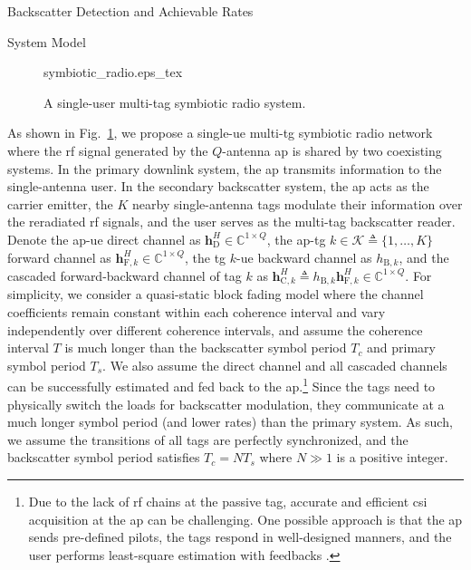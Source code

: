\documentclass[journal]{IEEEtran}
\begin{document}
	\begin{section}{Backscatter Detection and Achievable Rates}
		\begin{subsection}{System Model}
			\begin{figure}[!t]
				\centering
				\def\svgwidth{0.9\columnwidth}
				{symbiotic_radio.eps_tex}
				\caption{A single-user multi-tag symbiotic radio system.}
				\label{fi:symbiotic_radio}
			\end{figure}
			As shown in Fig.~\ref{fi:symbiotic_radio}, we propose a single-\gls{ue} multi-\gls{tg} symbiotic radio network where the \gls{rf} signal generated by the $Q$-antenna \gls{ap} is shared by two coexisting systems. In the primary downlink system, the \gls{ap} transmits information to the single-antenna user. In the secondary backscatter system, the \gls{ap} acts as the carrier emitter, the $K$ nearby single-antenna tags modulate their information over the reradiated \gls{rf} signals, and the user serves as the multi-tag backscatter reader. Denote the \gls{ap}-\gls{ue} direct channel as $\boldsymbol{h}_{\mathrm{D}}^H \in \mathbb{C}^{1 \times Q}$, the \gls{ap}-\gls{tg} $k \in \mathcal{K} \triangleq \{1,\ldots,K\}$ forward channel as $\boldsymbol{h}_{\mathrm{F},k}^H \in \mathbb{C}^{1 \times Q}$, the \gls{tg} $k$-\gls{ue} backward channel as $h_{\mathrm{B},k}$, and the cascaded forward-backward channel of tag $k$ as $\boldsymbol{h}_{\mathrm{C},k}^H \triangleq h_{\mathrm{B},k} \boldsymbol{h}_{\mathrm{F},k}^H \in \mathbb{C}^{1 \times Q}$. For simplicity, we consider a quasi-static block fading model where the channel coefficients remain constant within each coherence interval and vary independently over different coherence intervals, and assume the coherence interval $T$ is much longer than the backscatter symbol period $T_c$ and primary symbol period $T_s$. We also assume the direct channel and all cascaded channels can be successfully estimated and fed back to the \gls{ap}.\footnote{Due to the lack of \gls{rf} chains at the passive tag, accurate and efficient \gls{csi} acquisition at the \gls{ap} can be challenging. One possible approach is that the \gls{ap} sends pre-defined pilots, the tags respond in well-designed manners, and the user performs least-square estimation with feedbacks \cite{Bharadia2015,Yang2015b,Guo2019g}.} Since the tags need to physically switch the loads for backscatter modulation, they communicate at a much longer symbol period (and lower rates) than the primary system. As such, we assume the transitions of all tags are perfectly synchronized, and the backscatter symbol period satisfies $T_c = N T_s$ where $N \gg 1$ is a positive integer.


\end{subsection}
\end{section}
\end{document}
